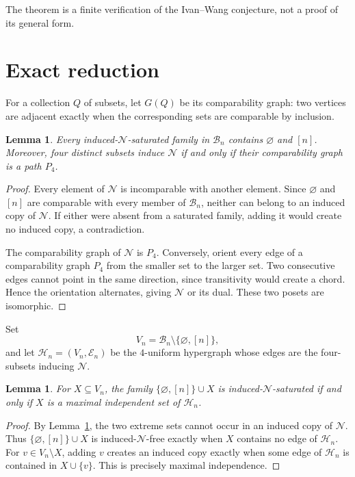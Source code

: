 \documentclass[11pt]{amsart}
\newtheorem{lemma}[theorem]{Lemma}
\newcommand{\Bn}{\mathcal B_n}
\newcommand{\Nposet}{\mathcal N}
\begin{document}
The theorem is a finite verification of the Ivan--Wang conjecture, not a proof
of its general form.

\section{Exact reduction}

For a collection $Q$ of subsets, let $G(Q)$ be its comparability graph: two
vertices are adjacent exactly when the corresponding sets are comparable by
inclusion.

\begin{lemma}\label{lem:basic}
Every induced-$\Nposet$-saturated family in $\Bn$ contains $\varnothing$ and
$[n]$. Moreover, four distinct subsets induce $\Nposet$ if and only if their
comparability graph is a path $P_4$.
\end{lemma}

\begin{proof}
Every element of $\Nposet$ is incomparable with another element. Since
$\varnothing$ and $[n]$ are comparable with every member of $\Bn$, neither can
belong to an induced copy of $\Nposet$. If either were absent from a saturated
family, adding it would create no induced copy, a contradiction.

The comparability graph of $\Nposet$ is $P_4$. Conversely, orient every edge
of a comparability graph $P_4$ from the smaller set to the larger set. Two
consecutive edges cannot point in the same direction, since transitivity would
create a chord. Hence the orientation alternates, giving $\Nposet$ or its
dual. These two posets are isomorphic.
\end{proof}

Set
\[
V_n=\Bn\setminus\{\varnothing,[n]\},
\]
and let $\mathcal H_n=(V_n,\mathcal E_n)$ be the $4$-uniform hypergraph whose
edges are the four-subsets inducing $\Nposet$.

\begin{lemma}\label{lem:hypergraph}
For $X\subseteq V_n$, the family $\{\varnothing,[n]\}\cup X$ is
induced-$\Nposet$-saturated if and only if $X$ is a maximal independent set of
$\mathcal H_n$.
\end{lemma}

\begin{proof}
By Lemma~\ref{lem:basic}, the two extreme sets cannot occur in an induced copy
of $\Nposet$. Thus $\{\varnothing,[n]\}\cup X$ is induced-$\Nposet$-free
exactly when $X$ contains no edge of $\mathcal H_n$. For $v\in V_n\setminus
X$, adding $v$ creates an induced copy exactly when some edge of $\mathcal
H_n$ is contained in $X\cup\{v\}$. This is precisely maximal independence.
\end{proof}
\end{document}
